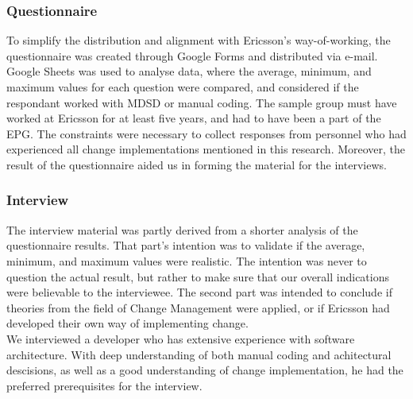 \documentclass[final_report_innit.tex]{subfiles}
\begin{document}
\subsubsection{Questionnaire}\label{approachInQuest}
To simplify the distribution and alignment with Ericsson's way-of-working, the questionnaire was created through Google Forms and distributed via e-mail. Google Sheets was used to analyse data, where the average, minimum, and maximum values for each question were compared, and considered if the respondant worked with MDSD or manual coding. The sample group must have worked at Ericsson for at least five years, and had to have been a part of the EPG. The constraints were necessary to collect responses from personnel who had experienced all change implementations mentioned in this research. Moreover, the result of the questionnaire aided us in forming the material for the interviews. 
\\

\subsubsection{Interview}\label{approachInInt}
The interview material was partly derived from a shorter analysis of the questionnaire results. That part's intention was to validate if the average, minimum, and maximum values were realistic. The intention was never to question the actual result, but rather to make sure that our overall indications were believable to the interviewee. The second part was intended to conclude if theories from the field of Change Management were applied, or if Ericsson had developed their own way of implementing change.
\\

We interviewed a developer who has extensive experience with software architecture. With deep understanding of both manual coding and achitectural descisions, as well as a good understanding of change implementation, he had the preferred prerequisites for the interview.
\end{document}
